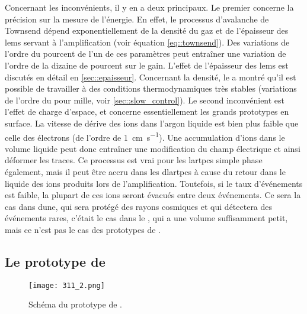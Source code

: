       Concernant les inconvénients, il y en a deux principaux. Le premier concerne la précision sur la mesure de l'énergie. En effet, le processus d'avalanche de Townsend dépend exponentiellement de la densité du gaz et de l'épaisseur des \glspl{lem} servant à l'amplification (voir équation \autoref{eq::townsend}). Des variations de l'ordre du pourcent de l'un de ces paramètres peut entraîner une variation de l'ordre de la dizaine de pourcent sur le gain. L'effet de l'épaisseur des \glspl{lem} est discutés en détail en \autoref{sec::epaisseur}. Concernant la densité, le \TOO{} a montré qu'il est possible de travailler à des conditions thermodynamiques très stables (variations de l'ordre du pour mille, voir \autoref{sec::slow_control}). Le second inconvénient est l'effet de charge d'espace, et concerne essentiellement les grands prototypes en surface. La vitesse de dérive des ions dans l'argon liquide est bien plus faible que celle des électrons (de l'ordre de \SI{1}{\centi\meter\per\second}). Une accumulation d'ions dans le volume liquide peut donc entraîner une modification du champ électrique et ainsi déformer les traces. Ce processus est vrai pour les \glspl{lartpc} simple phase également, mais il peut être accru dans les \glspl{dlartpc} à cause du retour dans le liquide des ions produits lors de l'amplification\cite{Romero2016}. Toutefois, si le taux d'événements est faible, la plupart de ces ions seront évacués entre deux événements. Ce sera la cas dans \gls{dune}, qui sera protégé des rayons cosmiques et qui détectera des événements rares, c'était le cas dans le \TOO{}, qui a une volume suffisamment petit, mais ce n'est pas le cas des prototypes de \protodp{}.

    \subsection{Le prototype de \TOO{}}\label{sec::TOO-intro}

      \begin{figure}[!htb]
        \centering
        \texttt{[image: 311\_2.png]}        
        \caption[Schéma du prototype de \TOO{}]{\label{fig::311}Schéma du prototype de \TOO{}.}
      \end{figure}

